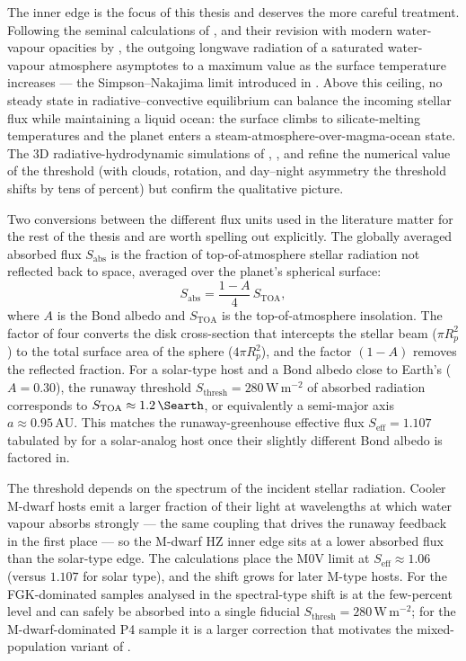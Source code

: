 The inner edge is the focus of this thesis and deserves the more
careful treatment.  Following the seminal calculations of
\textcite{Nakajima1992}, and their revision with modern water-vapour
opacities by \textcite{Goldblatt2013}, the outgoing longwave radiation
of a saturated water-vapour atmosphere asymptotes to a maximum value
as the surface temperature increases --- the Simpson--Nakajima limit
introduced in .  Above this ceiling, no
steady state in radiative--convective equilibrium can balance the
incoming stellar flux while maintaining a liquid ocean: the surface
climbs to silicate-melting temperatures and the planet enters a
steam-atmosphere-over-magma-ocean state.  The 3D radiative-hydrodynamic
simulations of \textcite{Leconte2013}, \textcite{Turbet2021}, and
\textcite{Chaverot2023} refine the numerical value of the threshold
(with clouds, rotation, and day--night asymmetry the threshold shifts
by tens of percent) but confirm the qualitative picture.

Two conversions between the different flux units used in the
literature matter for the rest of the thesis and are worth spelling
out explicitly.  The globally averaged absorbed flux $S_\mathrm{abs}$
is the fraction of top-of-atmosphere stellar radiation not reflected
back to space, averaged over the planet's spherical surface:
%
\begin{equation}
    S_\mathrm{abs} = \frac{1-A}{4}\, S_\mathrm{TOA},
    \label{eq:sabs_stoa}
\end{equation}
%
where $A$ is the Bond albedo and $S_\mathrm{TOA}$ is the
top-of-atmosphere insolation.  The factor of four converts the disk
cross-section that intercepts the stellar beam ($\pi R_p^2$) to the
total surface area of the sphere ($4\pi R_p^2$), and the factor
$(1-A)$ removes the reflected fraction.  For a solar-type host and a
Bond albedo close to Earth's ($A=0.30$), the runaway threshold
$S_\mathrm{thresh}=280\,\mathrm{W\,m^{-2}}$ of absorbed radiation
corresponds to $S_\mathrm{TOA}\approx 1.2\,\Searth$, or equivalently a
semi-major axis $a\approx 0.95\,\mathrm{AU}$.  This matches the
runaway-greenhouse effective flux $S_\mathrm{eff}=1.107$ tabulated by
\textcite{Kopparapu2013} for a solar-analog host once their slightly
different Bond albedo is factored in.

The threshold depends on the spectrum of the incident stellar
radiation.  Cooler M-dwarf hosts emit a larger fraction of their
light at wavelengths at which water vapour absorbs strongly --- the
same coupling that drives the runaway feedback in the first place ---
so the M-dwarf HZ inner edge sits at a lower absorbed flux than the
solar-type edge.  The \textcite{Kopparapu2014} calculations place the
M0V limit at $S_\mathrm{eff}\approx 1.06$ (versus $1.107$ for solar
type), and the shift grows for later M-type hosts.  For the
FGK-dominated \PLATO samples analysed in  the
spectral-type shift is at the few-percent level and can safely be
absorbed into a single fiducial $S_\mathrm{thresh}=280\,\mathrm{W\,m^{-2}}$;
for the M-dwarf-dominated P4 sample it is a larger correction that
motivates the mixed-population variant of .

